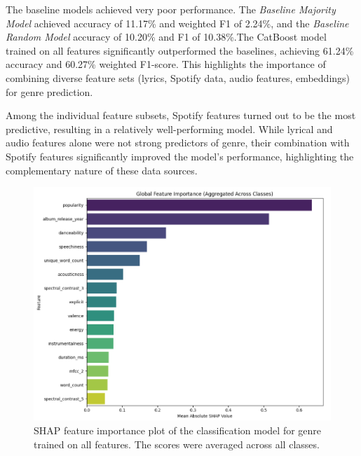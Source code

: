 The baseline models achieved very poor performance. The \textit{Baseline
Majority Model} achieved accuracy of 11.17\% and weighted F1 of 2.24\%, and the
\textit{Baseline Random Model} accuracy of 10.20\% and F1 of 10.38\%.The
CatBoost model trained on all features significantly outperformed the
baselines, achieving 61.24\% accuracy and 60.27\% weighted F1-score. This
highlights the importance of combining diverse feature sets (lyrics, Spotify
data, audio features, embeddings) for genre prediction.

Among the individual feature subsets, Spotify features turned out to be the
most predictive, resulting in a relatively well-performing model. While lyrical
and audio features alone were not strong predictors of genre, their combination
with Spotify features significantly improved the model's performance,
highlighting the complementary nature of these data sources.





\begin{center}
\begin{figure}[H]
  \centering
  \includegraphics[width=5in]{img/feature_importance_genre_clf.png}
  \caption{SHAP feature importance plot of the classification model for genre
  trained on all features. The scores were averaged across all classes.}
  \label{Figure:fig_eh}
\end{figure}
\end{center}

